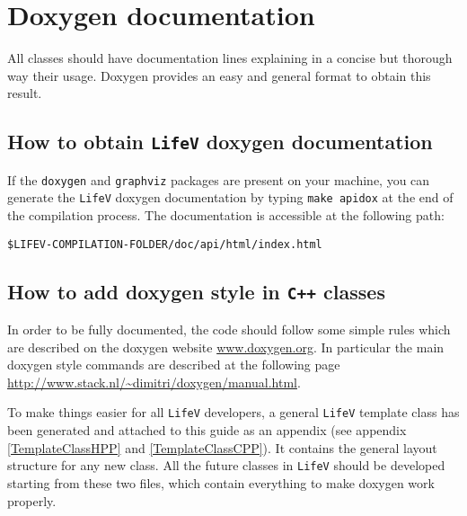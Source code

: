 \documentclass[a4paper]{article}
\begin{document}
\section{Doxygen documentation} \label{doxygen}
All classes should have documentation lines explaining in a concise but thorough way their usage. Doxygen provides an easy and general format to obtain this result.

\subsection{How to obtain \texttt{LifeV} doxygen documentation} If the \texttt{doxygen} and \texttt{graphviz} packages are present on your machine, you can generate the \texttt{LifeV} doxygen documentation by typing \texttt{make apidox} at the end of the compilation process. The documentation is accessible at the following path: \newline

\texttt{\$LIFEV-COMPILATION-FOLDER/doc/api/html/index.html}\newline

\subsection{How to add doxygen style in \texttt{C++} classes}
In order to be fully documented, the code should follow some simple rules which are described on the doxygen website \url{www.doxygen.org}. In particular the main doxygen style commands are described at the following page \url{http://www.stack.nl/~dimitri/doxygen/manual.html}.

To make things easier for all \texttt{LifeV} developers, a general \texttt{LifeV} template class has been generated and attached to this guide as an appendix (see appendix \ref{TemplateClassHPP} and \ref{TemplateClassCPP}). It contains the general layout structure for any new class. All the future classes in \texttt{LifeV} should be developed starting from these two files, which contain everything to make doxygen work properly.
\end{document}
